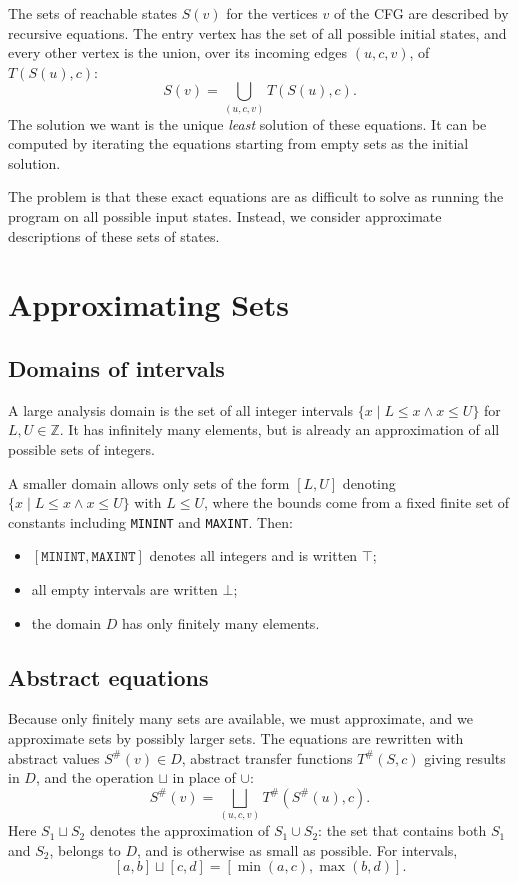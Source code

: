 The sets of reachable states $S(v)$ for the vertices $v$ of the CFG are described by recursive equations. The entry vertex has the set of all possible initial states, and every other vertex is the union, over its incoming edges $(u, c, v)$, of $T(S(u), c)$:
\[
S(v) = \bigcup_{(u, c, v)} T(S(u), c).
\]
The solution we want is the unique \emph{least} solution of these equations. It can be computed by iterating the equations starting from empty sets as the initial solution.
 
The problem is that these exact equations are as difficult to solve as running the program on all possible input states. Instead, we consider approximate descriptions of these sets of states.
 
\section{Approximating Sets}
 
\subsection*{Domains of intervals}
 
A large analysis domain is the set of all integer intervals $\{x \mid L \le x \wedge x \le U\}$ for $L, U \in \mathbb{Z}$. It has infinitely many elements, but is already an approximation of all possible sets of integers.
 
A smaller domain allows only sets of the form $[L, U]$ denoting $\{x \mid L \le x \wedge x \le U\}$ with $L \le U$, where the bounds come from a fixed finite set of constants including \texttt{MININT} and \texttt{MAXINT}. Then:
\begin{itemize}
  \item $[\texttt{MININT}, \texttt{MAXINT}]$ denotes all integers and is written $\top$;
  \item all empty intervals are written $\bot$;
  \item the domain $D$ has only finitely many elements.
\end{itemize}
 
\subsection*{Abstract equations}
 
Because only finitely many sets are available, we must approximate, and we approximate sets by possibly larger sets. The equations are rewritten with abstract values $S^\#(v) \in D$, abstract transfer functions $T^\#(S, c)$ giving results in $D$, and the operation $\sqcup$ in place of $\cup$:
\[
S^\#(v) = \bigsqcup_{(u, c, v)} T^\#(S^\#(u), c).
\]
Here $S_1 \sqcup S_2$ denotes the approximation of $S_1 \cup S_2$: the set that contains both $S_1$ and $S_2$, belongs to $D$, and is otherwise as small as possible. For intervals,
\[
[a, b] \sqcup [c, d] = [\min(a, c), \max(b, d)].
\]
 
